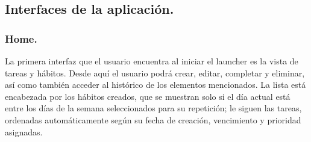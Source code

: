 \subsection{Interfaces de la aplicación.}

\subsubsection{Home.}

La primera interfaz que el usuario encuentra al iniciar el launcher es la vista de tareas y hábitos. Desde aquí el usuario podrá crear, editar, completar y eliminar, así como también acceder al histórico de los elementos mencionados. La lista está encabezada por los hábitos creados, que se muestran solo si el día actual está entre los días de la semana seleccionados para su repetición; le siguen las tareas, ordenadas automáticamente según su fecha de creación, vencimiento y prioridad asignadas.

